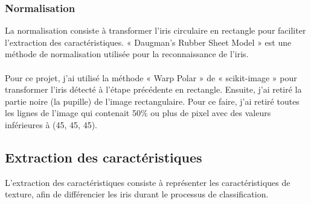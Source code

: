 \documentclass[12pt,twoside,letterpaper]{article}
\begin{document}
\subsubsection{Normalisation}
La normalisation consiste à transformer l’iris circulaire en rectangle pour faciliter l’extraction des caractéristiques. « Daugman’s Rubber Sheet Model » est une méthode de normalisation utilisée pour la reconnaissance de l’iris.\cite{ref_01}\cite{ref_06}
\\~\\
Pour ce projet, j'ai utilisé la méthode « Warp Polar » de « scikit-image » pour transformer l'iris détecté à l'étape précédente en rectangle. Ensuite, j'ai retiré la partie noire (la pupille) de l'image rectangulaire. Pour ce faire, j'ai retiré toutes les lignes de l'image qui contenait 50\% ou plus de pixel avec des valeurs inférieures à (45, 45, 45).

\subsection{Extraction des caractéristiques}
L’extraction des caractéristiques consiste à représenter les caractéristiques de texture, afin de différencier les iris durant le processus de classification.\cite{ref_01}\cite{ref_06}
\end{document}
